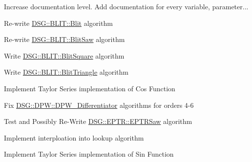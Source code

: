 
\begin{DoxyRefList}
\item[\label{todo__todo000006}%
\hypertarget{todo__todo000006}{}%
Namespace \hyperlink{namespace_d_s_g}{D\+S\+G} ]Increase documentation level. Add documentation for every variable, parameter...  
\item[\label{todo__todo000001}%
\hypertarget{todo__todo000001}{}%
Class \hyperlink{class_d_s_g_1_1_b_l_i_t_1_1_blit}{D\+S\+G\+:\+:B\+L\+I\+T\+:\+:Blit} ]Re-\/write \hyperlink{class_d_s_g_1_1_b_l_i_t_1_1_blit}{D\+S\+G\+::\+B\+L\+I\+T\+::\+Blit} algorithm  
\item[\label{todo__todo000002}%
\hypertarget{todo__todo000002}{}%
Class \hyperlink{class_d_s_g_1_1_b_l_i_t_1_1_blit_saw}{D\+S\+G\+:\+:B\+L\+I\+T\+:\+:Blit\+Saw} ]Re-\/write \hyperlink{class_d_s_g_1_1_b_l_i_t_1_1_blit_saw}{D\+S\+G\+::\+B\+L\+I\+T\+::\+Blit\+Saw} algorithm  
\item[\label{todo__todo000003}%
\hypertarget{todo__todo000003}{}%
Class \hyperlink{class_d_s_g_1_1_b_l_i_t_1_1_blit_square}{D\+S\+G\+:\+:B\+L\+I\+T\+:\+:Blit\+Square} ]Write \hyperlink{class_d_s_g_1_1_b_l_i_t_1_1_blit_square}{D\+S\+G\+::\+B\+L\+I\+T\+::\+Blit\+Square} algorithm  
\item[\label{todo__todo000004}%
\hypertarget{todo__todo000004}{}%
Class \hyperlink{class_d_s_g_1_1_b_l_i_t_1_1_blit_triangle}{D\+S\+G\+:\+:B\+L\+I\+T\+:\+:Blit\+Triangle} ]Write \hyperlink{class_d_s_g_1_1_b_l_i_t_1_1_blit_triangle}{D\+S\+G\+::\+B\+L\+I\+T\+::\+Blit\+Triangle} algorithm  
\item[\label{todo__todo000010}%
\hypertarget{todo__todo000010}{}%
Member \hyperlink{namespace_d_s_g_ade303ad15c77f534429305c3cbd90191}{D\+S\+G\+:\+:Cos} (double const \&x)]Implement Taylor Series implementation of Cos Function  
\item[\label{todo__todo000005}%
\hypertarget{todo__todo000005}{}%
Class \hyperlink{class_d_s_g_1_1_d_p_w_1_1_d_p_w___differentiator}{D\+S\+G\+:\+:D\+P\+W\+:\+:D\+P\+W\+\_\+\+Differentiator$<$ order $>$} ]Fix \hyperlink{class_d_s_g_1_1_d_p_w_1_1_d_p_w___differentiator}{D\+S\+G\+::\+D\+P\+W\+::\+D\+P\+W\+\_\+\+Differentiator} algorithms for orders 4-\/6  
\item[\label{todo__todo000007}%
\hypertarget{todo__todo000007}{}%
Class \hyperlink{class_d_s_g_1_1_e_p_t_r_1_1_e_p_t_r_saw}{D\+S\+G\+:\+:E\+P\+T\+R\+:\+:E\+P\+T\+R\+Saw} ]Test and Possibly Re-\/\+Write \hyperlink{class_d_s_g_1_1_e_p_t_r_1_1_e_p_t_r_saw}{D\+S\+G\+::\+E\+P\+T\+R\+::\+E\+P\+T\+R\+Saw} algorithm  
\item[\label{todo__todo000008}%
\hypertarget{todo__todo000008}{}%
Class \hyperlink{class_d_s_g_1_1_l_u_t}{D\+S\+G\+:\+:L\+U\+T$<$ element, size $>$} ]Implement interploation into lookup algorithm  
\item[\label{todo__todo000009}%
\hypertarget{todo__todo000009}{}%
Member \hyperlink{namespace_d_s_g_aad63d316081c7d13a551acf346ee2749}{D\+S\+G\+:\+:Sin} (double const \&x)]Implement Taylor Series implementation of Sin Function 
\end{DoxyRefList}